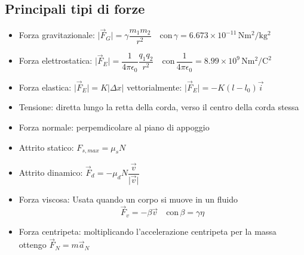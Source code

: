 \documentclass[10pt,a4paper]{article}
\newcommand{\abs}[1]{\lvert {#1} \rvert}
\newcommand{\scinot}[2]{{#1} \times 10^{#2}}
\begin{document}
	\vspace{5mm}
	\subsection{Principali tipi di forze}
	\begin{itemize}
	\item Forza gravitazionale: \( \abs{\vec{F}_G} = \gamma \dfrac{m_1 m_2}{r^2} \quad \text{con} \, \gamma = \scinot{6.673}{-11} \, \si{\newton\metre\squared\per\kilo\gram\squared} \)
	\item Forza elettrostatica: \( \abs{\vec{F}_E} = \dfrac{1}{4\pi\epsilon_0} \dfrac{q_1 q_2}{r^2} \quad \text{con} \, \dfrac{1}{4\pi\epsilon_0} = \scinot{8.99}{9} \, \si{\newton\metre\squared\per\coulomb\squared}\)
	\item Forza elastica: \( \abs{\vec{F}_E} = K\abs{\Delta x} \) \quad vettorialmente: \( \abs{\vec{F}_E} = -K(l-l_0)\vec{i} \)
	\item Tensione: diretta lungo la retta della corda, verso il centro della corda stessa
	\item Forza normale: perpemdicolare al piano di appoggio
	\item Attrito statico: \( F_{s,max} = \mu_s N \)
	\item Attrito dinamico: \( \vec{F}_d = -\mu_d N \dfrac{\vec{v}}{\abs{\vec{v}}} \)
	\item Forza viscosa: Usata quando un corpo si muove in un fluido
		\[
		\vec{F}_v = -\beta\vec{v} \quad \text{con} \, \beta = \gamma\eta
		\]
	\item Forza centripeta: moltiplicando l'accelerazione centripeta per la massa ottengo \( \vec{F}_N = m\vec{a}_N \)
	\end{itemize}

	\vspace{5mm}
\end{document}
